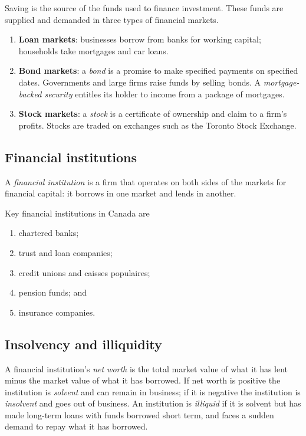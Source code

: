 Saving is the source of the funds used to finance investment. These funds are supplied
and demanded in three types of financial markets.
\begin{enumerate}
  \item \textbf{Loan markets}: businesses borrow from banks for working capital;
        households take mortgages and car loans.
  \item \textbf{Bond markets}: a \emph{bond} is a promise to make specified payments on
        specified dates. Governments and large firms raise funds by selling bonds. A
        \emph{mortgage-backed security} entitles its holder to income from a package of
        mortgages.
  \item \textbf{Stock markets}: a \emph{stock} is a certificate of ownership and claim to a
        firm's profits. Stocks are traded on exchanges such as the Toronto Stock Exchange.
\end{enumerate}

\subsection{Financial institutions}

\begin{definition}
A \emph{financial institution} is a firm that operates on both sides of the markets for
financial capital: it borrows in one market and lends in another.
\end{definition}

Key financial institutions in Canada are
\begin{enumerate}
  \item chartered banks;
  \item trust and loan companies;
  \item credit unions and caisses populaires;
  \item pension funds; and
  \item insurance companies.
\end{enumerate}

\subsection{Insolvency and illiquidity}

\begin{definition}
A financial institution's \emph{net worth} is the total market value of what it has lent
minus the market value of what it has borrowed. If net worth is positive the institution
is \emph{solvent} and can remain in business; if it is negative the institution is
\emph{insolvent} and goes out of business. An institution is \emph{illiquid} if it is
solvent but has made long-term loans with funds borrowed short term, and faces a sudden
demand to repay what it has borrowed.
\end{definition}

